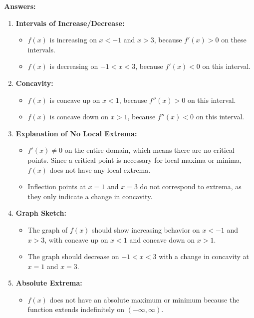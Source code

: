 \documentclass{article}
\begin{document}
\textbf{Answers:}
\begin{enumerate}
    \item \textbf{Intervals of Increase/Decrease:}
    \begin{itemize}
        \item \(f(x)\) is increasing on \(x < -1\) and \(x > 3\), because \(f'(x) > 0\) on these intervals.
        \item \(f(x)\) is decreasing on \(-1 < x < 3\), because \(f'(x) < 0\) on this interval.
    \end{itemize}
    \item \textbf{Concavity:}
    \begin{itemize}
        \item \(f(x)\) is concave up on \(x < 1\), because \(f''(x) > 0\) on this interval.
        \item \(f(x)\) is concave down on \(x > 1\), because \(f''(x) < 0\) on this interval.
    \end{itemize}
    \item \textbf{Explanation of No Local Extrema:}
    \begin{itemize}
        \item \(f'(x) \neq 0\) on the entire domain, which means there are no critical points. Since a critical point is necessary for local maxima or minima, \(f(x)\) does not have any local extrema.
        \item Inflection points at \(x = 1\) and \(x = 3\) do not correspond to extrema, as they only indicate a change in concavity.
    \end{itemize}
    \item \textbf{Graph Sketch:}
    \begin{itemize}
        \item The graph of \(f(x)\) should show increasing behavior on \(x < -1\) and \(x > 3\), with concave up on \(x < 1\) and concave down on \(x > 1\).
        \item The graph should decrease on \(-1 < x < 3\) with a change in concavity at \(x = 1\) and \(x = 3\).
    \end{itemize}
    \item \textbf{Absolute Extrema:}
    \begin{itemize}
        \item \(f(x)\) does not have an absolute maximum or minimum because the function extends indefinitely on \((- \infty, \infty)\).
    \end{itemize}
\end{enumerate}
\end{document}
